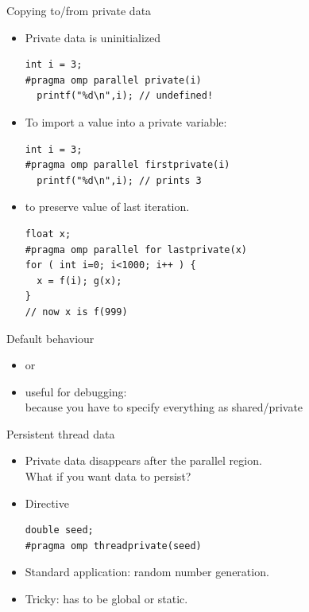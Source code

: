 \begin{numberedframe}{Copying to/from private data}
  \begin{itemize}
  \item Private data is uninitialized
\begin{lstlisting}
int i = 3;
#pragma omp parallel private(i)
  printf("%d\n",i); // undefined!
\end{lstlisting}
  \item To import a value into a private variable:
\begin{lstlisting}
int i = 3;
#pragma omp parallel firstprivate(i)
  printf("%d\n",i); // prints 3
\end{lstlisting}
  \item {} to preserve value of last iteration.
\begin{lstlisting}
float x;
#pragma omp parallel for lastprivate(x)
for ( int i=0; i<1000; i++ ) {
  x = f(i); g(x);
}
// now x is f(999)
\end{lstlisting}
  \end{itemize}
\end{numberedframe}

\begin{numberedframe}{Default behaviour}
  \begin{itemize}
  \item {} or 
  \item useful for debugging: \\ because you have
    to specify everything as shared/private
  \end{itemize}
\end{numberedframe}

\begin{numberedframe}{Persistent thread data}
  \begin{itemize}
  \item Private data disappears after the parallel region.\\
    What if you want data to persist?
  \item Directive 
\begin{lstlisting}
double seed;
#pragma omp threadprivate(seed)
\end{lstlisting}
\item Standard application: random number generation.
\item Tricky: has to be global or static.
  \end{itemize}
\end{numberedframe}

